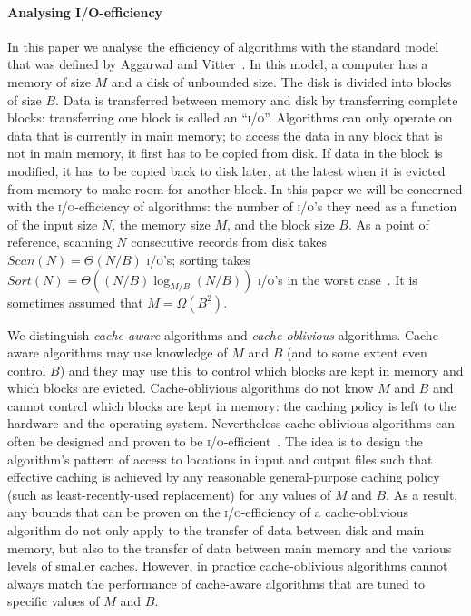 \documentclass[10pt,a4paper]{article}
\def\io{\textsc{i/o}\xspace}
\def\ios{\textsc{i/o}'s\xspace}
\def\sort{\mathit{Sort}}
\def\Sort(#1){({#1}/B) \log_{M/B} ({#1}/B)}
\def\scan{\mathit{Scan}}
\begin{document}
\paragraph*{Analysing I/O-efficiency}
In this paper we analyse the efficiency of algorithms with the standard model that was defined by Aggarwal and Vitter~\cite{iomodel}. In this model, a computer has a memory of size $M$ and a disk of unbounded size. The disk is divided into blocks of size $B$. Data is transferred between memory and disk by transferring complete blocks: transferring one block is called an ``\io''. Algorithms can only operate on data that is currently in main memory; to access the data in any block that is not in main memory, it first has to be copied from disk. If data in the block is modified, it has to be copied back to disk later, at the latest when it is evicted from memory to make room for another block. In this paper we will be concerned with the \io-efficiency of algorithms: the number of \ios they need as a function of the input size $N$, the memory size $M$, and the block size $B$. As a point of reference, scanning $N$ consecutive records from disk takes $\scan(N) = \Theta(N/B)$ \ios; sorting takes $\sort(N) = \Theta(\Sort(N))$ \ios in the worst case~\cite{iomodel}. It is sometimes assumed that $M = \Omega(B^2)$.

We distinguish \emph{cache-aware} algorithms and \emph{cache-oblivious} algorithms. Cache-aware algorithms may use knowledge of $M$ and $B$ (and to some extent even control $B$) and they may use this to control which blocks are kept in memory and which blocks are evicted. Cache-oblivious algorithms do not know $M$ and $B$ and cannot control which blocks are kept in memory: the caching policy is left to the hardware and the operating system. Nevertheless cache-oblivious algorithms can often be designed and proven to be \io-efficient~\cite{flpr-coa-99}. The idea is to design the algorithm's pattern of access to locations in input and output files such that effective caching is achieved by any reasonable general-purpose caching policy (such as least-recently-used replacement) for any values of $M$ and $B$. As a result, any bounds that can be proven on the \io-efficiency of a cache-oblivious algorithm do not only apply to the transfer of data between disk and main memory, but also to the transfer of data between main memory and the various levels of smaller caches. However, in practice cache-oblivious algorithms cannot always match the performance of cache-aware algorithms that are tuned to specific values of $M$ and $B$.
\end{document}
